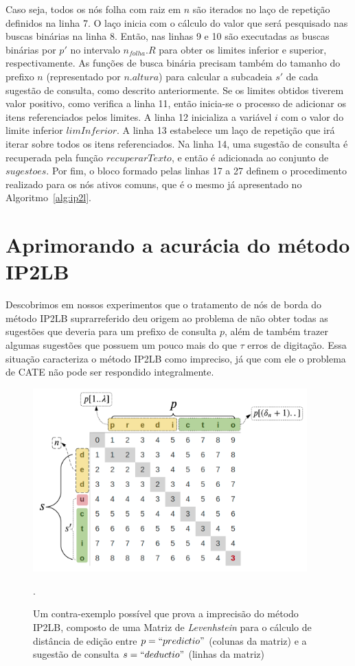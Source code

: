 Caso seja, todos os nós folha com raiz em $n$ são iterados no laço de repetição definidos na linha 7. O laço inicia com o cálculo do valor que será pesquisado nas buscas binárias na linha 8. Então, nas linhas 9 e 10 são executadas as buscas binárias por $p'$ no intervalo $n_{folha}.R$ para obter os limites inferior e superior, respectivamente. As funções de busca binária precisam também do tamanho do prefixo $n$ (representado por $n.altura$) para calcular a subcadeia $s'$ de cada sugestão de consulta, como descrito anteriormente. Se os limites obtidos tiverem valor positivo, como verifica a linha 11, então inicia-se o processo de adicionar os itens referenciados pelos limites. A linha 12 inicializa a variável $i$ com o valor do limite inferior $limInferior$. A linha 13 estabelece um laço de repetição que irá iterar sobre todos os itens referenciados. Na linha 14, uma sugestão de consulta é recuperada pela função $recuperarTexto$, e então é adicionada ao conjunto de $sugestoes$. Por fim, o bloco formado pelas linhas 17 a 27 definem o procedimento realizado para os nós ativos comuns, que é o mesmo já apresentado no Algoritmo~\ref{alg:ip2l}.

\section{Aprimorando a acurácia do método IP2LB}
\label{sec:IP2LRB}

Descobrimos em nossos experimentos que o tratamento de nós de borda do método IP2LB suprarreferido deu origem ao problema de não obter todas as sugestões que deveria para um prefixo de consulta $p$, além de também trazer algumas sugestões que possuem um pouco mais do que $\tau$ erros de digitação. Essa situação caracteriza o método IP2LB como impreciso, já que com ele o problema de CATE não pode ser respondido integralmente.

 \begin{figure} [ht]
    \centering
    \includegraphics[width=0.94\textwidth]{figures/binary_search_counterproof.png}
    \caption{Um contra-exemplo possível que prova a imprecisão do método IP2LB, composto de uma Matriz de \textit{Levenhstein} para o cálculo de distância de edição entre $p=``predictio"$ (colunas da matriz) e a sugestão de consulta $s=``deductio"$ (linhas da matriz)}.
    \label{fig:binary_search_counterproof}
\end{figure}

